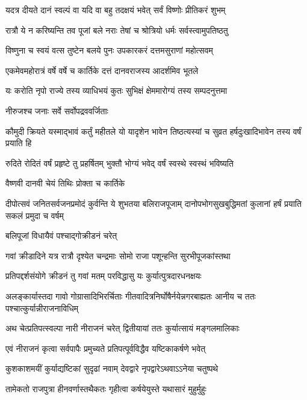 \twolineshloka
{यदत्र दीयते दानं स्वल्पं वा यदि वा बहु}
{तदक्षयं भवेत् सर्वं विष्णोः प्रीतिकरं शुभम्} %

\twolineshloka
{रात्रौ ये न करिष्यन्ति तव पूजां बले नराः}
{तेषां च श्रोत्रियो धर्मः सर्वस्त्वामुपतिष्ठतु} %

\twolineshloka
{विष्णुना च स्वयं वत्स तुष्टेन बलये पुनः}
{उपकारकरं दत्तमसुराणां महोत्सवम्} %

\twolineshloka
{एकमेवमहोरात्रं वर्षे वर्षे च कार्तिके}
{दत्तं दानवराजस्य आदर्शमिव भूतले} %

\twolineshloka
{यः करोति नृपो राज्ये तस्य व्याधिभयं कुतः}
{सुभिक्षं क्षेममारोग्यं तस्य सम्पदनुत्तमा} %


\onelineshloka
{नीरुजश्च जनाः सर्वे सर्वोपद्रववर्जिताः} %

\threelineshloka
{कौमुदी क्रियते यस्माद्भावं कर्तुं महीतले}
{यो यादृशेन भावेन तिष्ठत्यस्यां च सुव्रत}
{हर्षदुःखादिभावेन तस्य वर्षं प्रयाति हि} %

\twolineshloka
{रुदिते रोदितं वर्षं प्रहृष्टे तु प्रहर्षितम्}
{भुक्तौ भोग्यं भवेद् वर्षं स्वस्थे स्वस्थं भविष्यति} %


\onelineshloka
{वैष्णवी दानवी चेयं तिथिः प्रोक्ता च कार्तिके} %

\fourlineindentedshloka
{दीपोत्सवं जनितसर्वजनप्रमोदं}
{कुर्वन्ति ये शुभतया बलिराजपूजाम्}
{दानोपभोगसुखबुद्धिमतां कुलानां}
{हर्षं प्रयाति सकलं प्रमुदा च वर्षम्} %


\onelineshloka
{बलिपूजां विधायैवं पश्चाद्गोक्रीडनं चरेत्} %

\twolineshloka
{गवां क्रीडादिने यत्र रात्रौ दृश्येत चन्द्रमाः}
{सोमो राजा पशून्हन्ति सुरभीपूजकांस्तथा} %

\twolineshloka
{प्रतिपद्दर्शसंयोगे क्रीडनं तु गवां मतम्}
{परविद्धासु यः कुर्यात्पुत्रदारधनक्षयः} %

\threelineshloka
{अलङ्कार्यास्तदा गावो गोग्रासादिभिरर्चिताः}
{गीतवादित्रनिर्घोषैर्नयेन्नगरबाह्यतः}
{आनीय च ततः पश्चात्कुर्यान्नीराजनाविधिम्} %

\twolineshloka
{अथ चेत्प्रतिपत्स्वल्पा नारी नीराजनं चरेत्}
{द्वितीयायां ततः कुर्यात्सायं मङ्गलमालिकाः} %

\twolineshloka
{एवं नीराजनं कृत्वा सर्वपापैः प्रमुच्यते}
{प्रतिपत्पूर्वविद्धैव यष्टिकाकर्षणे भवेत्} %

\twolineshloka
{कुशकाशमयीं कुर्याद्यष्टिकां सुदृढां नवाम्}
{देवद्वारे नृपद्वारेऽथवाऽऽनेया चतुष्पथे} %

\twolineshloka
{तामेकतो राजपुत्रा हीनवर्णास्तथैकतः}
{गृहीत्वा कर्षयेयुस्ते यथासारं मुहुर्मुहुः} %

